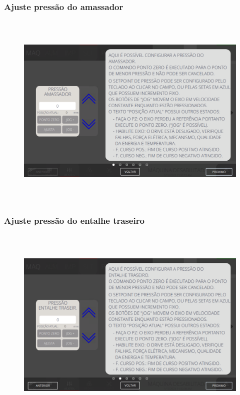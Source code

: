 \subsubsection{\small{Ajuste pressão do amassador}}\label{telaAjustesSlotterAjustePressaoDoAmassador}
\vspace*{\fill}
\begin{figure}[h]
  \centering
  \includegraphics[width=576px,height=360px]{src/imagesFlexo/05-slotter/settings/e-1.png}
\end{figure}
\vspace*{\fill}

\newpage
\thispagestyle{fancy}
\vspace*{40 pt}
\subsubsection{\small{Ajuste pressão do entalhe traseiro}}\label{telaAjustesSlotterAjustePressaoDoEntalheTraseiro}
\vspace*{\fill}
\begin{figure}[h]
  \centering
  \includegraphics[width=576px,height=360px]{src/imagesFlexo/05-slotter/settings/e-2.png}
\end{figure}
\vspace*{\fill}


